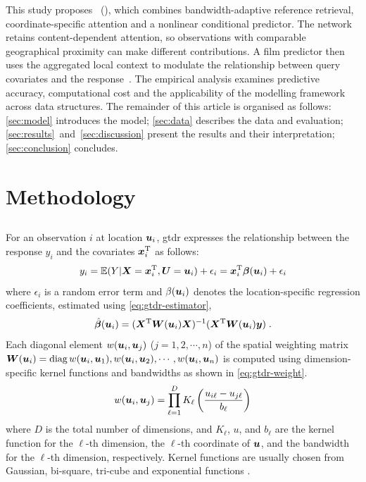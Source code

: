 \documentclass[]{interact}
\newcommand{\glstitle}[1]{\glsentrytitlecase{#1}{long}~(\glsentryshort{#1})\glsunset{#1}}
\newcommand{\Exp}{\mathbb{E}}
\begin{document}
This study proposes \glstitle{dlan}, which combines bandwidth-adaptive reference retrieval,
coordinate-specific attention and a nonlinear conditional predictor.
The network retains content-dependent attention, so observations with comparable geographical proximity can make different contributions.
A \gls{film} predictor then uses the aggregated local context to modulate the relationship between query covariates and the response~\citep{PerezStrub-2018}.
The empirical analysis examines predictive accuracy,
computational cost and the applicability of the modelling framework across data structures.
The remainder of this article is organised as follows:
\autoref{sec:model} introduces the model;
\autoref{sec:data} describes the data and evaluation;
\autoref{sec:results}~and~\ref{sec:discussion} present the results and their interpretation;
\autoref{sec:conclusion} concludes.

\section{Methodology}\label{sec:model}

\subsection{}

For an observation $i$ at location $\bm{u}_i$, \gls{gtdr} expresses the relationship between the response $y_i$ and the covariates $\bm{x}^\mathrm{T}_i$ as follows:
\begin{equation}\label{eq:gtdr}
  y_i = \Exp(Y|\vX=\vx\T_i,\vU=\vu_i) + \epsilon_i = \vx\T_i \vbeta(\vu_i) + \epsilon_i
\end{equation}
where $\epsilon_i$ is a random error term and $\beta(\bm{u}_i)$ denotes the location-specific regression coefficients, estimated using \autoref{eq:gtdr-estimator},
\begin{equation}\label{eq:gtdr-estimator}
  \hat{\bm{\beta}}(\bm{u}_i) = (\bm{X}^\mathrm{T} \bm{W}(\bm{u}_i) \bm{X})^{-1} (\bm{X}^\mathrm{T} \bm{W}(\bm{u}_i) \bm{y}) \;.
\end{equation}
Each diagonal element $w(\bm{u}_i,\bm{u}_j)$ ($j=1,2,\cdots,n$) of the spatial weighting matrix $\bm{W}(\bm{u}_i) = \operatorname{diag}{w(\bm{u}_i,\bm{u}_1),w(\bm{u}_i,\bm{u}_2),\cdots,w(\bm{u}_i,\bm{u}_n)}$ is computed using dimension-specific kernel functions and bandwidths as shown in \autoref{eq:gtdr-weight}.
\begin{equation}\label{eq:gtdr-weight}
  w(\bm{u}_i,\bm{u}_j) = \prod_{\ell=1}^D K_\ell\left(\frac{u_{i\ell}-u_{j\ell}}{b_\ell}\right) 
\end{equation}
where $D$ is the total number of dimensions, and $K_\ell$, $u$, and $b_\ell$ are the kernel function for the $\ell$-th dimension, the $\ell$-th coordinate of $\bm{u}$, and the bandwidth for the $\ell$-th dimension, respectively.
Kernel functions are usually chosen from Gaussian, bi-square, tri-cube and exponential functions \citep{LuHu-2025}.
\end{document}
